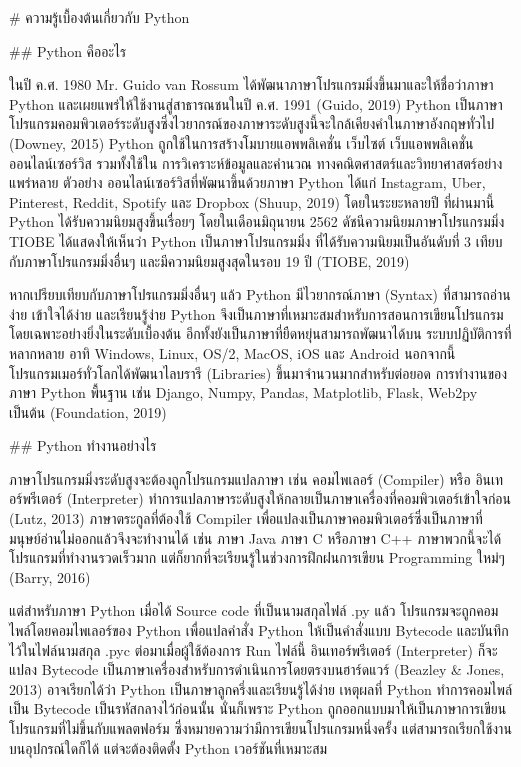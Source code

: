 \begin{markdown}

# ความรู้เบื้องต้นเกี่ยวกับ Python

## Python คืออะไร

ในปี ค.ศ. 1980 Mr. Guido van Rossum ได้พัฒนาภาษาโปรแกรมมิ่งขึ้นมาและให้ชื่อว่าภาษา Python และเผยแพร่ให้ใช้งานสู่สาธารณชนในปี ค.ศ. 1991 (Guido, 2019) Python เป็นภาษาโปรแกรมคอมพิวเตอร์ระดับสูงซึ่งไวยากรณ์ของภาษาระดับสูงนี้จะใกล้เคียงคำในภาษาอังกฤษทั่วไป (Downey, 2015) Python ถูกใช้ในการสร้างโมบายแอพพลิเคชั่น เว็บไซต์ เว็บแอพพลิเคชั่น ออนไลน์เซอร์วิส รวมทั้งใช้ใน การวิเคราะห์ข้อมูลและคำนวณ ทางคณิตศาสตร์และวิทยาศาสตร์อย่างแพร่หลาย  ตัวอย่าง ออนไลน์เซอร์วิสที่พัฒนาขึ้นด้วยภาษา Python ได้แก่ Instagram, Uber, Pinterest, Reddit, Spotify และ Dropbox (Shuup, 2019) โดยในระยะหลายปี ที่ผ่านมานี้ Python ได้รับความนิยมสูงขึ้นเรื่อยๆ โดยในเดือนมิถุนายน 2562 ดัชนีความนิยมภาษาโปรแกรมมิ่ง TIOBE ได้แสดงให้เห็นว่า Python เป็นภาษาโปรแกรมมิ่ง ที่ได้รับความนิยมเป็นอันดับที่ 3 เทียบกับภาษาโปรแกรมมิ่งอื่นๆ และมีความนิยมสูงสุดในรอบ 19 ปี (TIOBE, 2019)

หากเปรียบเทียบกับภาษาโปรแกรมมิ่งอื่นๆ แล้ว Python มีไวยากรณ์ภาษา (Syntax) ที่สามารถอ่านง่าย เข้าใจได้ง่าย และเรียนรู้ง่าย Python จึงเป็นภาษาที่เหมาะสมสำหรับการสอนการเขียนโปรแกรมโดยเฉพาะอย่างยิ่งในระดับเบื้องต้น อีกทั้งยังเป็นภาษาที่ยืดหยุ่นสามารถพัฒนาได้บน ระบบปฏิบัติการที่หลากหลาย อาทิ  Windows, Linux, OS/2, MacOS, iOS และ Android นอกจากนี้ โปรแกรมเมอร์ทั่วโลกได้พัฒนาไลบรารี (Libraries) ขึ้นมาจำนวนมากสำหรับต่อยอด การทำงานของภาษา Python พื้นฐาน เช่น Django, Numpy, Pandas, Matplotlib, Flask, Web2py เป็นต้น (Foundation, 2019)

## Python ทำงานอย่างไร

ภาษาโปรแกรมมิ่งระดับสูงจะต้องถูกโปรแกรมแปลภาษา เช่น คอมไพเลอร์ (Compiler) หรือ อินเทอร์พรีเตอร์ (Interpreter) ทำการแปลภาษาระดับสูงให้กลายเป็นภาษาเครื่องที่คอมพิวเตอร์เข้าใจก่อน (Lutz, 2013) ภาษาตระกูลที่ต้องใช้ Compiler เพื่อแปลงเป็นภาษาคอมพิวเตอร์ซึ่งเป็นภาษาที่มนุษย์อ่านไม่ออกแล้วจึงจะทำงานได้ เช่น ภาษา Java ภาษา C หรือภาษา C++ ภาษาพวกนี้จะได้โปรแกรมที่ทำงานรวดเร็วมาก แต่ก็ยากที่จะเรียนรู้ในช่วงการฝึกฝนการเขียน Programming ใหม่ๆ (Barry, 2016)

แต่สำหรับภาษา Python เมื่อได้ Source code ที่เป็นนามสกุลไฟล์ .py แล้ว โปรแกรมจะถูกคอมไพล์โดยคอมไพเลอร์ของ Python เพื่อแปลคำสั่ง Python ให้เป็นคำสั่งแบบ Bytecode และบันทึกไว้ในไฟล์นามสกุล .pyc ต่อมาเมื่อผู้ใช้ต้องการ Run ไฟล์นี้ อินเทอร์พรีเตอร์ (Interpreter) ก็จะแปลง Bytecode เป็นภาษาเครื่องสำหรับการดำเนินการโดยตรงบนฮาร์ดแวร์ (Beazley \& Jones, 2013) อาจเรียกได้ว่า Python เป็นภาษาลูกครึ่งและเรียนรู้ได้ง่าย เหตุผลที่ Python ทำการคอมไพล์เป็น Bytecode เป็นรหัสกลางไว้ก่อนนั้น นั่นก็เพราะ Python ถูกออกแบบมาให้เป็นภาษาการเขียนโปรแกรมที่ไม่ขึ้นกับแพลตฟอร์ม ซึ่งหมายความว่ามีการเขียนโปรแกรมหนึ่งครั้ง แต่สามารถเรียกใช้งานบนอุปกรณ์ใดก็ได้ แต่จะต้องติดตั้ง Python เวอร์ชันที่เหมาะสม 


\end{markdown}